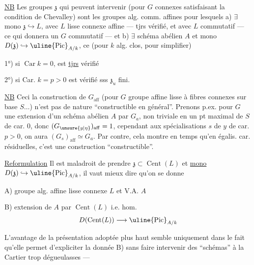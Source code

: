 \uline{NB} Les groupes $\mathfrak z$ qui peuvent intervenir (pour $G$ connexes
satisfaisant la condition de Chevalley) sont  les groupes
alg. comm. affines pour lesquels a) $\exists$ mono  $\mathfrak z\hookrightarrow L$,
avec $L$ lisse connexe affine --- tjrs vérifié, et  avec
$L$ commutatif --- ce qui donnera un $G$ commutatif ---
et b) $\exists$ schéma abélien $A$ et mono $D(\mathfrak z)\hookrightarrow\uline{\operatorname{Pic}}_{A/k}$, ce
  (pour $k$ alg. clos, pour simplifier)

1°) si $\operatorname{Car}k=0$,  est \uline{tjrs} vérifié

2°) si Car. $k=p>0$ est vérifié sss $\mathfrak z_u$ fini.


\uline{NB} Ceci    la construction de $G_{\mathrm{aff}}$  (pour $G$
groupe affine lisse à fibres connexes sur base $S\ldots$) n'est pas
de nature ``constructible en général''. Prenons p.ex. pour $G$
une extension d'un schéma abélien $A$ par $G_a$, non triviale
en un pt maximal  de $S$ de car. 0, donc $(G_\unsure{y|\eta})_{\mathrm{aff}}=1$, cependant
aux  spécialisations $s$ de $y$ de car. $p>0$, on aura $(G_s)_{\mathrm{aff}}\simeq G_a$.
Par contre, cela montre en  temps qu'en égalis. car.
résiduelles, c'est une construction  ``constructible''.

\uline{Reformulation} Il est maladroit de prendre $\mathfrak z\subset\operatorname{Cent}(L)$ et
\uline{mono}  $D(\mathfrak z)\hookrightarrow\uline{\operatorname{Pic}}_{A/k}$, il vaut mieux dire qu'on se
donne

A) groupe alg. affine lisse connexe $L$ et V.A. $A$

B) extension de $A$ par $\operatorname{Cent}(L)$ i.e. hom.
\[D(\operatorname{Cent}(L))\longrightarrow\uline{\operatorname{Pic}}_{A/k}\]

L'avantage de la présentation adoptée plus haut semble
uniquement dans le fait qu'elle permet d'expliciter
la donnée B) sans faire intervenir des ``schémas'' à la
Cartier trop dégueulasses ---

